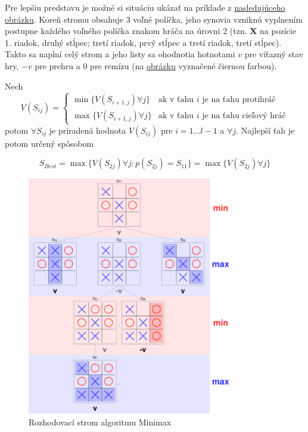 Pre lepšiu predstavu je možné si situáciu ukázať na príklade z \hyperref[figure:minimax-tree]{nasledujúceho obrázku}.
Koreň stromu obsahuje 3 voľné políčka, jeho synovia vzniknú vyplnením postupne každého voľného políčka znakom hráča na
úrovni 2 (tzn. \textbf{X} na pozície 1. riadok, druhý stĺpec; tretí riadok, prvý stĺpec a tretí riadok, tretí stĺpec).
Takto sa naplní celý strom a jeho listy sa ohodnotia hotnotami $v$ pre víťazný stav hry, $-v$ pre prehru a $0$ pre
remízu (na \hyperref[figure:minimax-tree]{obrázku} vyznačené čiernou farbou).

Nech
\begin{equation}
    V(S_{ij}) =
    \begin{cases}
        \min{\{V(S_{i+1,j}) \forall j\}} & \text{ak v ťahu } i \text{ je na ťahu protihráč} \\
        \max{\{V(S_{i+1,j}) \forall j\}} & \text{ak v ťahu } i \text{ je na ťahu cieľový hráč}
    \end{cases}
\end{equation}
potom $\forall S_{ij}$ je priradená hodnota $V(S_{ij})$ pre $i = 1 \dots l-1$ a $\forall j$.
Najlepší ťah je potom určený spôsobom

\begin{equation}
    S_{Best} = \max{\{V(S_{2j}) \forall j \colon p(S_{2j}) = S_{11}\}} = \max{\{V(S_{2j}) \forall j\}}
\end{equation}

\begin{figure}[H]
    \centering
    \includegraphics[width=0.8\textwidth]{images/minmax-tree.png}
    \caption{Rozhodovací strom algoritmu Minimax}
\end{figure}\label{figure:minimax-tree}

